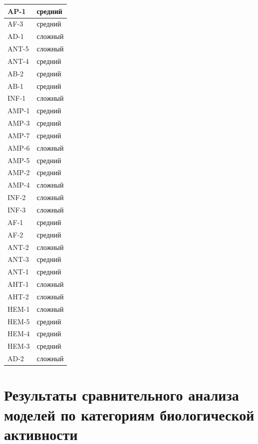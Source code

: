 \documentclass[specification,annotation,times]{itmo-student-thesis}
\begin{document}
\begin{longtable}{
| >{\centering\arraybackslash}p{7cm}
| >{\centering\arraybackslash}p{7cm}|
}
AP-1 & средний\\ \hline
AF-3 & средний\\ \hline
AD-1 & сложный\\ \hline
ANT-5 & сложный\\ \hline
ANT-4 & средний\\ \hline
AB-2 & средний\\ \hline
AB-1 & средний\\ \hline
INF-1 & сложный\\ \hline
AMP-1 & средний\\ \hline
AMP-3 & средний\\ \hline
AMP-7 & средний\\ \hline
AMP-6 & сложный\\ \hline
AMP-5 & средний\\ \hline
AMP-2 & средний\\ \hline
AMP-4 & сложный\\ \hline
INF-2 & сложный\\ \hline
INF-3 & сложный\\ \hline
AF-1 & средний\\ \hline
AF-2 & средний\\ \hline
ANT-2 & сложный\\ \hline
ANT-3 & средний\\ \hline
ANT-1 & средний\\ \hline
AHT-1 & сложный\\ \hline
AHT-2 & сложный\\ \hline
HEM-1 & сложный\\ \hline
HEM-5 & средний\\ \hline
HEM-4 & средний\\ \hline
HEM-3 & средний\\ \hline
AD-2 & сложный\\ \hline

\end{longtable}


\chapter{Результаты сравнительного анализа моделей по категориям биологической активности}\label{sec:app:3:tab-data}
\end{document}
